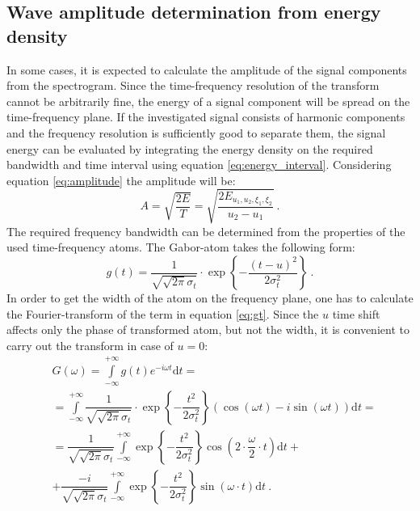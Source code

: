 \documentclass[a4paper,12pt,oneside]{article}
\newcommand{\dt}{\mathrm{d}t}
\begin{document}
\subsection{Wave amplitude determination from energy density}

In some cases, it is expected to calculate the amplitude of the signal components from the spectrogram. Since the time-frequency resolution of the transform cannot be arbitrarily fine, the energy of a signal component will be spread on the time-frequency plane. If the investigated signal consists of harmonic components and the frequency resolution is sufficiently good to separate them, the signal energy can be evaluated by integrating the energy density on the required bandwidth and time interval using equation \eqref{eq:energy_interval}. Considering equation \eqref{eq:amplitude} the amplitude will be:
\begin{equation}\label{eq:amplitude2}
  A = \sqrt{\frac{2E}{T}} = \sqrt{\frac{2E_{u_1, u_2, \xi_1, \xi_2}}{u_2-u_1}} \ .
\end{equation}
The required frequency bandwidth can be determined from the properties of the used time-frequency atoms. The Gabor-atom takes the following form:
\begin{equation}\label{eq:gt}
  g(t) = \frac{1}{\sqrt{\sqrt{2\pi}\sigma_t}} \cdot \exp\left\{-\frac{(t-u)^2}{2\sigma_t^2}\right\} \ .
\end{equation}
In order to get the width of the atom on the frequency plane, one has to calculate the Fourier-transform of the term in equation \eqref{eq:gt}. Since the $u$ time shift affects only the phase of transformed atom, but not the width, it is convenient to carry out the transform in case of $u=0$:
\begin{eqnarray}\label{eq:fgt}
  & G(\omega) = \int\limits_{-\infty}^{+\infty} g(t) e^{-i\omega t} \dt = \nonumber\\
  & = \int\limits_{-\infty}^{+\infty} \dfrac{1}{\sqrt{\sqrt{2\pi}\sigma_t}} \cdot \exp\left\{-\dfrac{t^2}{2\sigma_t^2}\right\} \left( \cos(\omega t) - i\sin(\omega t) \right) \dt  = \nonumber\\
  & = \dfrac{1}{\sqrt{\sqrt{2\pi}\sigma_t}} \int\limits_{-\infty}^{+\infty} \exp\left\{-\dfrac{t^2}{2\sigma_t^2}\right\} \cos\left(2 \cdot \dfrac{\omega}{2} \cdot  t \right) \dt + \nonumber\\
  & + \dfrac{-i}{\sqrt{\sqrt{2\pi}\sigma_t}} \int\limits_{-\infty}^{+\infty} \exp\left\{-\dfrac{t^2}{2\sigma_t^2}\right\} \sin(\omega \cdot  t) \dt \ .
\end{eqnarray}
\end{document}
